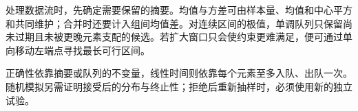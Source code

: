处理数据流时，先确定需要保留的摘要。均值与方差可由样本量、均值和中心平方和共同维护；合并时还要计入组间均值差。对连续区间的极值，单调队列只保留尚未过期且未被更晚元素支配的候选。若扩大窗口只会使约束更难满足，便可通过单向移动左端点寻找最长可行区间。

正确性依靠摘要或队列的不变量，线性时间则依靠每个元素至多入队、出队一次。随机模拟另需证明接受后的分布与终止性；拒绝后重新抽样时，必须使用新的独立试验。
\par\smallskip
